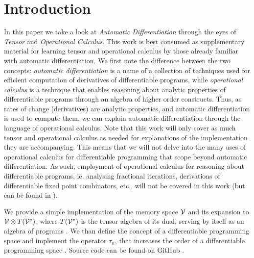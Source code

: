 \section{Introduction}\label{sec:introduction}

In this paper we take a look at \emph{Automatic Differentiation} through the eyes of \emph{Tensor} and \emph{Operational Calculus}. This work is best consumed as supplementary material for learning tensor and operational calculus by those already familiar with automatic differentiation. We first note the difference between the two concepts: \emph{automatic differentiation} is a name of a collection of techniques used for efficient computation of derivatives of differentiable programs, while \emph{operational calculus} is a technique that enables reasoning about analytic properties of differentiable programs through an algebra of higher order constructs. Thus, as rates of change (derivatives) are analytic properties, and automatic differentiation is used to compute them, we can explain automatic differentiation through the language of operational calculus. Note that this work will only cover as much tensor and operational calculus as needed for explanations of the implementation they are accompanying. This means that we will not delve into the many uses of operational calculus for differentiable programming that scope beyond automatic differentiation. As such, employment of operational calculus for reasoning about differentiable programs, ie. analysing fractional iterations, derivations of differentiable fixed point combinators, etc., will not be covered in this work (but can be found in \cite{OperationalCalculus}).

We provide a simple implementation of the memory space $\mathcal{V}$ and its expansion to $\mathcal{V}\otimes T(\mathcal{V}^*)$, where $T(\mathcal{V}^*)$ is the tensor algebra of its dual, serving by itself as an algebra of programs \cite[Definition~4.1]{OperationalCalculus}. We than define the concept of a differentiable programming space and implement the operator $\tau_n$, that increases the order of a differentiable programming space \cite[Proposition~5.1]{OperationalCalculus}.
Source code can be found on GitHub \cite{dCpp}.


